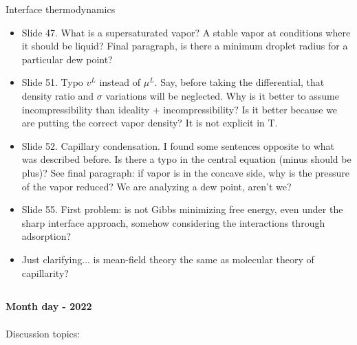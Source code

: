 \documentclass[8pt]{beamer}
\begin{document}
	\begin{frame}[t]{Interface thermodynamics}
		\begin{itemize}
			\item Slide 47. What is a supersaturated vapor? A stable vapor at conditions where it should be liquid? Final paragraph, is there a minimum droplet radius for a particular dew point?
			
			\item Slide 51. Typo $v^L$ instead of $\mu^L$. Say, before taking the differential, that density ratio and $\sigma$ variations will be neglected. Why is it better to assume incompressibility than ideality + incompressibility? Is it better because we are putting the correct vapor density? It is not explicit in T. 
			
			\item Slide 52. Capillary condensation. I found some sentences opposite to what was described before. Is there a typo in the central equation (minus should be plus)? See final paragraph: if vapor is in the concave side, why is the pressure of the vapor reduced? We are analyzing a dew point, aren't we?
			
			\item Slide 55. First problem: is not Gibbs minimizing free energy, even under the sharp interface approach, somehow considering the interactions through adsorption?
			
			\item Just clarifying... is mean-field theory the same as molecular theory of capillarity?
		\end{itemize}
	\end{frame}

	
	
	
	\subsection{}
	\label{}
	\justifying
	\begin{frame}{}
		\textbf{Month day - 2022}\\~\\
		Discussion topics:
	\end{frame}
	
\end{document}
